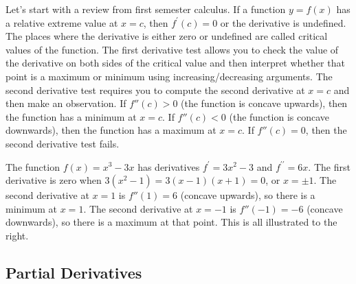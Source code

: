 Let's start with a review from first semester calculus. 
If a function $y=f(x)$ has a relative extreme value at $x=c$, then $f^\prime(c)=0$ or the derivative is undefined. 
The places where the derivative is either zero or undefined are called critical values of the function. 
The first derivative test allows you to check the value of the derivative on both sides of the critical value and then interpret whether that point is a maximum or minimum using increasing/decreasing arguments.  
The second derivative test requires you to compute the second derivative at $x=c$ and then make an observation. 
If $f''(c)>0$ (the function is concave upwards), then the function has a minimum at $x=c$. 
If $f''(c)<0$ (the function is concave downwards), then the function has a maximum at $x=c$. 
If $f''(c)=0$, then the second derivative test fails. 

\begin{example}
The function $f(x) = x^3-3x$ has derivatives $f^\prime = 3x^2-3$ and $f^{\prime\prime}=6x$.  The first derivative is zero when $3(x^2-1)=3(x-1)(x+1)=0$, or $x=\pm 1$.  
The second derivative at $x=1$ is $f''(1)=6$ (concave upwards), so there is a minimum at $x=1$.  
The second derivative at $x=-1$ is $f''(-1)=-6$ (concave downwards), so there is a maximum at that point. This is all illustrated to the right.
\end{example}

\subsection{Partial Derivatives}

